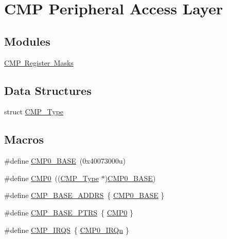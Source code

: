 \hypertarget{group___c_m_p___peripheral___access___layer}{}\section{C\+MP Peripheral Access Layer}
\label{group___c_m_p___peripheral___access___layer}
\subsection*{Modules}
\begin{DoxyCompactItemize}
\item 
\mbox{\hyperlink{group___c_m_p___register___masks}{C\+M\+P Register Masks}}
\end{DoxyCompactItemize}
\subsection*{Data Structures}
\begin{DoxyCompactItemize}
\item 
struct \mbox{\hyperlink{struct_c_m_p___type}{C\+M\+P\+\_\+\+Type}}
\end{DoxyCompactItemize}
\subsection*{Macros}
\begin{DoxyCompactItemize}
\item 
\#define \mbox{\hyperlink{group___c_m_p___peripheral___access___layer_gaa174cde56b35e3d6a74b2a752296c268}{C\+M\+P0\+\_\+\+B\+A\+SE}}~(0x40073000u)
\item 
\#define \mbox{\hyperlink{group___c_m_p___peripheral___access___layer_ga2cf98276319113bb5d9ece4d7d7ed09d}{C\+M\+P0}}~((\mbox{\hyperlink{struct_c_m_p___type}{C\+M\+P\+\_\+\+Type}} $\ast$)\mbox{\hyperlink{group___c_m_p___peripheral___access___layer_gaa174cde56b35e3d6a74b2a752296c268}{C\+M\+P0\+\_\+\+B\+A\+SE}})
\item 
\#define \mbox{\hyperlink{group___c_m_p___peripheral___access___layer_gad9f05fa33dbe017e0dd089dab69067d7}{C\+M\+P\+\_\+\+B\+A\+S\+E\+\_\+\+A\+D\+D\+RS}}~\{ \mbox{\hyperlink{group___c_m_p___peripheral___access___layer_gaa174cde56b35e3d6a74b2a752296c268}{C\+M\+P0\+\_\+\+B\+A\+SE}} \}
\item 
\#define \mbox{\hyperlink{group___c_m_p___peripheral___access___layer_gacc69654296499d45b2060956a3c8e97f}{C\+M\+P\+\_\+\+B\+A\+S\+E\+\_\+\+P\+T\+RS}}~\{ \mbox{\hyperlink{group___c_m_p___peripheral___access___layer_ga2cf98276319113bb5d9ece4d7d7ed09d}{C\+M\+P0}} \}
\item 
\#define \mbox{\hyperlink{group___c_m_p___peripheral___access___layer_ga2497116c7859b3f4e8fe3e1b21a84cd9}{C\+M\+P\+\_\+\+I\+R\+QS}}~\{ \mbox{\hyperlink{group___interrupt__vector__numbers_gga666eb0caeb12ec0e281415592ae89083a869842c366512b0bc4c29e77e8b32217}{C\+M\+P0\+\_\+\+I\+R\+Qn}} \}
\end{DoxyCompactItemize}


